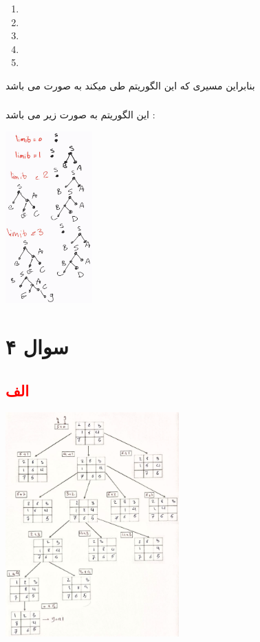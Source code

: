 \documentclass{article}
\begin{document}
\subsubsection*{}
 \begin{center}
 	\begin{enumerate}
 		\item {}
 		\item {}
 		\item {}
 		\item {}
 		\item {}
 	\end{enumerate}
 \end{center}
بنابراین مسیری که این الگوریتم طی میکند به صورت 
می باشد 
\subsubsection*{\textcolor{red}{}}
این الگوریتم به صورت زیر می باشد : 
	\begin{center}
	\includegraphics[width=0.25\textwidth]{q3p2}
\end{center}

\section*{سوال ۴}
\subsection*{\textcolor{red}{الف}}
\begin{center}
	\includegraphics[width=0.5\textwidth]{q4p1}
\end{center}
\end{document}
